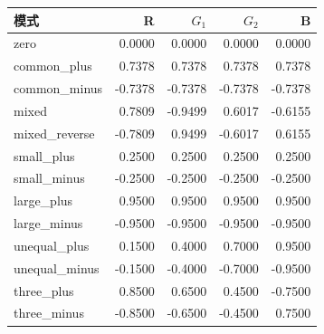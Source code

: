 \begin{inlinetable}
\centering
\caption{P01 的偏移标签示例（DN），通道顺序同图\ref{fig:ptc}。}\label{tab:patterns}
\footnotesize
\setlength{\tabcolsep}{4pt}
\begin{tabular}{lrrrr}
\toprule
模式 & R & $G_1$ & $G_2$ & B \\
\midrule
zero & 0.0000 & 0.0000 & 0.0000 & 0.0000 \\
common\_plus & 0.7378 & 0.7378 & 0.7378 & 0.7378 \\
common\_minus & -0.7378 & -0.7378 & -0.7378 & -0.7378 \\
mixed & 0.7809 & -0.9499 & 0.6017 & -0.6155 \\
mixed\_reverse & -0.7809 & 0.9499 & -0.6017 & 0.6155 \\
small\_plus & 0.2500 & 0.2500 & 0.2500 & 0.2500 \\
small\_minus & -0.2500 & -0.2500 & -0.2500 & -0.2500 \\
large\_plus & 0.9500 & 0.9500 & 0.9500 & 0.9500 \\
large\_minus & -0.9500 & -0.9500 & -0.9500 & -0.9500 \\
unequal\_plus & 0.1500 & 0.4000 & 0.7000 & 0.9500 \\
unequal\_minus & -0.1500 & -0.4000 & -0.7000 & -0.9500 \\
three\_plus & 0.8500 & 0.6500 & 0.4500 & -0.7500 \\
three\_minus & -0.8500 & -0.6500 & -0.4500 & 0.7500 \\
\bottomrule
\end{tabular}
\end{inlinetable}
